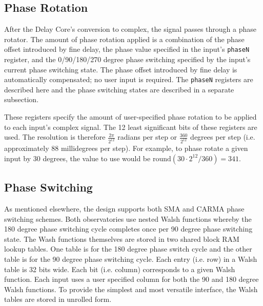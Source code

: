 \documentclass[12pt]{article}
\begin{document}
  \subsection{Phase Rotation}

After the Delay Core's conversion to complex, the signal passes through a phase
rotator.  The amount of phase rotation applied is a combination of the phase
offset introduced by fine delay, the phase value specified in the input's
\verb|phaseN| register, and the 0/90/180/270 degree phase switching specified
by the input's current phase switching state.  The phase offset introduced by
fine delay is automatically compensated; no user input is required.  The
\verb|phaseN| registers are described here and the phase switching states are
described in a separate subsection.

\begin{description}

 These registers specify the amount of user-specified phase
rotation to be applied to each input's complex signal.  The 12 least
significant bits of these registers are used.  The resolution is therefore
$\frac{2 \pi}{2^{12}}$ radians per step or $\frac{360}{2^{12}}$ degrees per
step (i.e. approximately 88 millidegrees per step).  For example, to phase
rotate a given input by 30 degrees, the value to use would be
$\mathrm{round}(30 \cdot 2^{12} / 360) = 341$.

\end{description}

  \subsection{Phase Switching}

As mentioned elsewhere, the design supports both SMA and CARMA phase switching
schemes.  Both observatories use nested Walsh functions whereby the 180 degree
phase switching cycle completes once per 90 degree phase switching state.  The
Wash functions themselves are stored in two shared block RAM lookup tables.
One table is for the 180 degree phase switch cycle and the other table is for
the 90 degree phase switching cycle.  Each entry (i.e. row) in a Walsh table is
32 bits wide.  Each bit (i.e. column) corresponds to a given Walsh function.
Each input uses a user specified column for both the 90 and 180 degree Walsh
functions.  To provide the simplest and most versatile interface, the Walsh
tables are stored in unrolled form.
\end{document}
